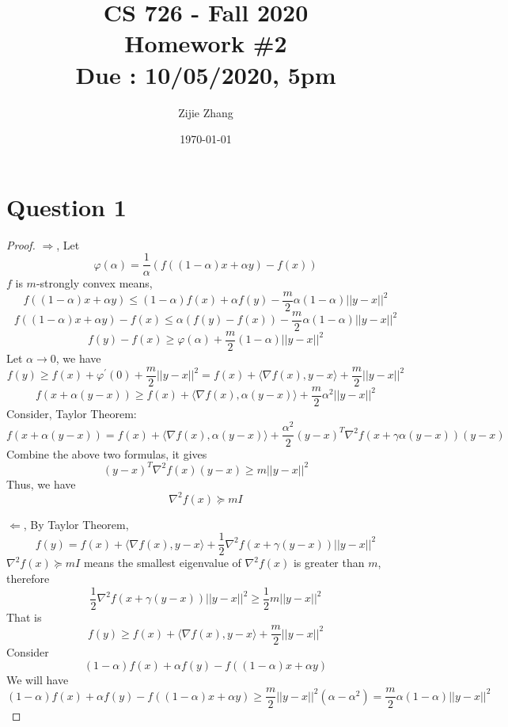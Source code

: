 \documentclass{article}
\title{CS 726 - Fall 2020\\
        {\Large \textbf{Homework \#2}}\\
        {\normalsize \textbf{Due : 10/05/2020, 5pm}}
    }
\author{Zijie Zhang}
\date{\today}
\begin{document}
    \maketitle

\section*{Question 1}
    \begin{proof}
        $\Rightarrow$,
        Let
        $$\varphi(\alpha)=\frac{1}{\alpha}\left(f\left((1-\alpha)x+\alpha y\right)-f(x)\right)$$
        $f$ is $m$-strongly convex means,
        $$f\left((1-\alpha)x+\alpha y\right) \leqslant (1-\alpha)f(x)+\alpha f(y)-\frac{m}{2} \alpha (1-\alpha)||y-x||^2$$
        $$f\left((1-\alpha)x+\alpha y\right) - f(x) \leqslant \alpha\left(f(y)-f(x)\right)-\frac{m}{2}\alpha(1-\alpha)||y-x||^2$$
        $$f(y)-f(x) \geqslant \varphi(\alpha)+\frac{m}{2}(1-\alpha)||y-x||^2$$
        Let $\alpha \to 0$,  we have
        $$f(y) \geqslant f(x) + \varphi^{'}(0)+\frac{m}{2}||y-x||^2=f(x) + \langle \nabla f(x), y-x\rangle + \frac{m}{2}||y-x||^2$$
        $$f(x+\alpha(y-x)) \geqslant f(x) + \langle \nabla f(x), \alpha(y-x)\rangle + \frac{m}{2}\alpha^2||y-x||^2$$
        Consider, Taylor Theorem:
        $$f(x+\alpha(y-x)) = f(x)+\langle \nabla f(x), \alpha(y-x)\rangle + \frac{\alpha^2}{2}(y-x)^T \nabla^2f(x+\gamma\alpha (y-x))(y-x)$$
        Combine the above two formulas, it gives
        $$(y-x)^T\nabla^2 f(x) (y-x) \geqslant m ||y-x||^2$$
        Thus, we have
        $$\nabla^2 f(x) \succeq mI$$

        $\Leftarrow$,
        By Taylor Theorem,
        $$f(y)=f(x)+\langle \nabla f(x), y-x \rangle + \frac{1}{2}\nabla^2 f(x+\gamma(y-x))||y-x||^2$$
        $\nabla^2 f(x) \succeq mI$ means the smallest eigenvalue of $\nabla^2 f(x)$ is greater than $m$, therefore
        $$\frac{1}{2}\nabla^2 f(x+\gamma(y-x))||y-x||^2 \geqslant \frac{1}{2}m||y-x||^2$$
        That is $$f(y) \geqslant f(x) + \langle \nabla f(x), y-x\rangle + \frac{m}{2}||y-x||^2$$
        Consider $$(1-\alpha)f(x)+\alpha f(y) -f((1-\alpha)x+\alpha y)$$
        We will have $$(1-\alpha)f(x)+\alpha f(y) -f((1-\alpha)x+\alpha y) \geqslant \frac{m}{2}||y-x||^2(\alpha -\alpha^2)=\frac{m}{2}\alpha(1-\alpha)||y-x||^2$$
    \end{proof}

\end{document}
